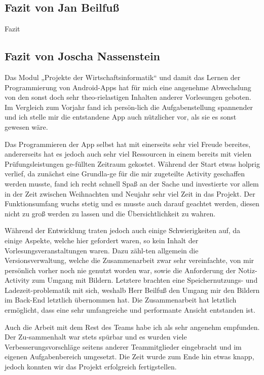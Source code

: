 \subsection{Fazit von Jan Beilfuß}

Fazit

\subsection{Fazit von Joscha Nassenstein}

Das Modul „Projekte der Wirtschaftsinformatik“ und damit das Lernen der Programmierung von Android-Apps hat für mich eine angenehme Abwechslung von den sonst doch sehr theo-rielastigen Inhalten anderer Vorlesungen geboten. Im Vergleich zum Vorjahr fand ich persön-lich die Aufgabenstellung spannender und ich stelle mir die entstandene App auch nützlicher vor, als sie es sonst gewesen wäre.

Das Programmieren der App selbst hat mit einerseits sehr viel Freude bereites, andererseits hat es jedoch auch sehr viel Ressourcen in einem bereits mit vielen Prüfungsleistungen ge-füllten Zeitraum gekostet. Während der Start etwas holprig verlief, da zunächst eine Grundla-ge für die mir zugeteilte Activity geschaffen werden musste, fand ich recht schnell Spaß an der Sache und investierte vor allem in der Zeit zwischen Weihnachten und Neujahr sehr viel Zeit in das Projekt. Der Funktionsumfang wuchs stetig und es musste auch darauf geachtet werden, diesen nicht zu groß werden zu lassen und die Übersichtlichkeit zu wahren.

Während der Entwicklung traten jedoch auch einige Schwierigkeiten auf, da einige Aspekte, welche hier gefordert waren, so kein Inhalt der Vorlesungsveranstaltungen waren. Dazu zähl-ten allgemein die Versionsverwaltung, welche die Zusammenarbeit zwar sehr vereinfachte, von mir persönlich vorher noch nie genutzt worden war, sowie die Anforderung der Notiz-Activity zum Umgang mit Bildern. Letztere brachten eine Speichernutzungs- und Ladezeit-problematik mit sich, weshalb Herr Beilfuß den Umgang mir den Bildern im Back-End letztlich übernommen hat. Die Zusammenarbeit hat letztlich ermöglicht, dass eine sehr umfangreiche und performante Ansicht entstanden ist.

Auch die Arbeit mit dem Rest des Teams habe ich als sehr angenehm empfunden. Der Zu-sammenhalt war stets spürbar und es wurden viele Verbesserungsvorschläge seitens anderer Teammitglieder eingebracht und im eigenen Aufgabenbereich umgesetzt. Die Zeit wurde zum Ende hin etwas knapp, jedoch konnten wir das Projekt erfolgreich fertigstellen.


